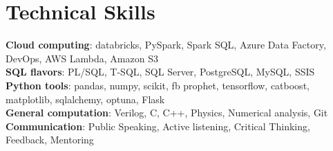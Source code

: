 \documentclass[a4paper,11pt]{article}
\makeatletter
\newcommand{\resumeItem}[1]{
  \item\small{
    {#1 \vspace{-2pt}}
  }
}
\newcommand{\resumeProjectHeading}[2]{
    \item
    \begin{tabular*}{0.97\textwidth}{l@{\extracolsep{\fill}}r}
      \small#1 & #2 \\
    \end{tabular*}\vspace{-7pt}
}
\newcommand{\resumeSubHeadingListStart}{\begin{itemize}[leftmargin=0.15in, label={}]}
\newcommand{\resumeSubHeadingListEnd}{\end{itemize}}
\newcommand{\resumeItemListStart}{\begin{itemize}}
\newcommand{\resumeItemListEnd}{\end{itemize}\vspace{-5pt}}
\makeatother
\begin{document}



%
\section{Technical Skills}
 \begin{itemize}[leftmargin=0.15in, label={}]
    \small{\item{
     \textbf{Cloud computing}{: databricks, PySpark, Spark SQL, Azure Data Factory, DevOps, AWS Lambda, Amazon S3} \\
     \textbf{SQL flavors}{: PL/SQL, T-SQL, SQL Server, PostgreSQL, MySQL, SSIS} \\
     \textbf{Python tools}{: pandas, numpy, scikit, fb prophet, tensorflow, catboost, matplotlib, sqlalchemy, optuna, Flask} \\
     \textbf{General computation}{: Verilog, C, C++, Physics, Numerical analysis, Git} \\
      \textbf{Communication}{: Public Speaking, Active listening, Critical Thinking, Feedback, Mentoring} 
    }}
 \end{itemize}


\end{document}

